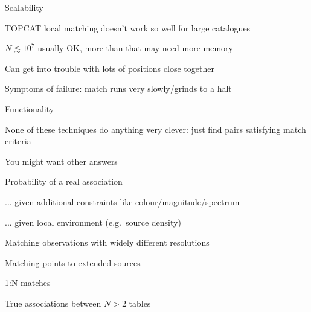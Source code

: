 \documentclass[20pt,landscape]{foils}
\begin{document}

\begin{list0}
  \item Scalability
  \begin{list2}
    \item TOPCAT local matching doesn't work so well for large catalogues
    \begin{list3}
      \item $N \lesssim 10^{7}$ usually OK, more than that may need more memory
    \end{list3}
    \item Can get into trouble with lots of positions close together
    \item Symptoms of failure: match runs very slowly/grinds to a halt
  \end{list2}
  \item Functionality
  \begin{list2}
    \item None of these techniques do anything very clever:
          just find pairs satisfying match criteria
    \item You might want other answers
    \begin{list3}
      \item Probability of a real association
      \item ... given additional constraints like colour/magnitude/spectrum
      \item ... given local environment (e.g.\ source density)
      \item Matching observations with widely different resolutions
      \item Matching points to extended sources
      \item 1:N matches
      \item True associations between $N>2$ tables
    \end{list3}
  \end{list2}
\end{list0}

\end{document}
